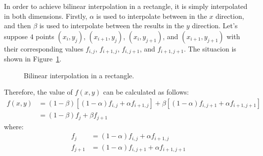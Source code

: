 \begin{itemize}
\begin{itemize}
        In order to achieve bilinear interpolation in a rectangle, it is simply interpolated in both dimensions. Firstly, $\alpha$ is used to interpolate between in the $x$ direction, and then $\beta$ is used to interpolate between the results in the $y$ direction. Let's suppose $4$ points $(x_i, y_j)$, $(x_{i+1}, y_j)$, $(x_i, y_{j+1})$, and $(x_{i+1}, y_{j+1})$ with their corresponding values $f_{i,j}$, $f_{i+1,j}$, $f_{i,j+1}$, and $f_{i+1,j+1}$. The situacion is shown in Figure~\ref{fig:bilinear-interpolation}.
        \begin{figure}
            \centering
            \caption{Bilinear interpolation in a rectangle.}
            \label{fig:bilinear-interpolation}
        \end{figure}

        Therefore, the value of $f(x,y)$ can be calculated as follows:
        \begin{align*}
            f(x,y) &= (1-\beta)\left[(1-\alpha)f_{i,j} + \alpha f_{i+1,j}\right] + \beta\left[(1-\alpha)f_{i,j+1} + \alpha f_{i+1,j+1}\right]\\
            &= (1-\beta)f_j + \beta f_{j+1}
        \end{align*}
        where:
        \begin{align*}
            f_j &= (1-\alpha)f_{i,j} + \alpha f_{i+1,j}\\
            f_{j+1} &= (1-\alpha)f_{i,j+1} + \alpha f_{i+1,j+1}
        \end{align*}


\end{itemize}
\end{itemize}
